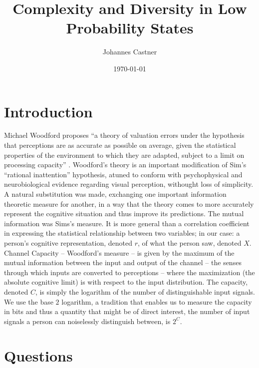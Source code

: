 \documentclass[11pt]{article}
\title{Complexity and Diversity in Low Probability States}
\author{Johannes Castner}
\date{\today}
\begin{document}
\maketitle

\setcounter{tocdepth}{3}
\tableofcontents
\vspace*{1cm}
\newpage

\begin{abstract} 

\end{abstract} 


\section{Introduction}
 Michael Woodford proposes ``a theory of valuation errors under the hypothesis that perceptions are as accurate as possible on average, given the statistical properties of the environment to which they are adapted, subject to a limit on processing capacity'' \citep{Woodford12}. Woodford's theory is an important modification of Sim's \citeyearpar{Sims98, Sims03, Sims11} ``rational inattention'' hypothesis, atuned to conform with psychophysical and neurobiological evidence regarding visual perception, withought loss of simplicity. A natural substitution was made, exchanging one important information theoretic measure for another, in a way that the theory comes to more accurately represent the cognitive situation and thus improve its predictions. The mutual information was Sims's measure. It is more general than a correlation coefficient in expressing the statistical relationship between two variables; in our case: a person's cognitive representation, denoted $r$, of what the person saw, denoted $X$. Channel Capacity -- Woodford's measure -- is given by the maximum of the mutual information between the input and output of the channel -- the senses through which inputs are converted to perceptions -- where the maximization (the absolute cognitive limit) is with respect to the input distribution. The capacity, denoted $C$, is simply the logarithm of the number of distinguishable input signals\citep{CoverThomas}. We use the base $2$ logarithm, a tradition that enables us to measure the capacity in bits and thus a quantity that might be of direct interest, the number of input signals a person can noiselessly distinguish between, is $2^C$.  

\section{Questions}
\end{document}
